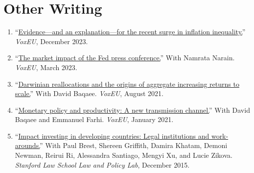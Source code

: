 \documentclass[letterpaper]{article}
\newcommand{\paper}[2]{``\href{#2}{#1}''}
\begin{document}
\section*{Other Writing}
\begin{enumerate}
\item \paper{Evidence---and an explanation---for the recent surge in inflation inequality.}{https://cepr.org/voxeu/columns/evidence-and-explanation-recent-surge-inflation-inequality} \textit{VoxEU}, December 2023.
\item \paper{The market impact of the Fed press conference.}{https://cepr.org/voxeu/columns/market-impact-fed-press-conference} With Namrata Narain. \textit{VoxEU}, March 2023.
\item \paper{Darwinian reallocations and the origins of aggregate increasing returns to scale.}{https://cepr.org/voxeu/columns/darwinian-reallocations-and-origins-aggregate-increasing-returns-scale} With David Baqaee. \textit{VoxEU}, August 2021.
\item \paper{Monetary policy and productivity: A new transmission channel.}{https://cepr.org/voxeu/columns/monetary-policy-and-productivity-new-transmission-channel} With David Baqaee and Emmanuel Farhi. \textit{VoxEU}, January 2021.
\item \paper{Impact investing in developing countries: Legal institutions and work-arounds.}{https://law.stanford.edu/wp-content/uploads/2019/10/Impact-Investing-In-the-Absence-of-Credible-Legal-Institutions-15-16-Final-Report.pdf} With Paul Brest, Shereen Griffith, Damira Khatam, Demoni Newman, Reirui Ri, Alessandra Santiago, Mengyi Xu, and Lucie Zikova. \textit{Stanford Law School Law and Policy Lab}, December 2015.
\end{enumerate}
\end{document}
